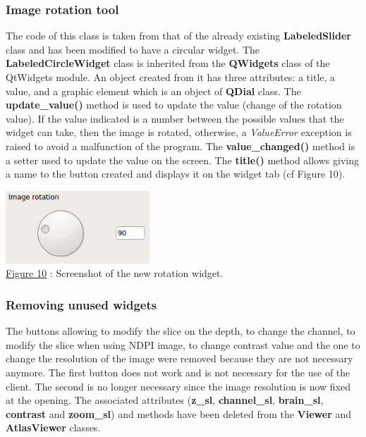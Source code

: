 \documentclass[a4paper,12pt]{report}
\begin{document}
\subsubsection{Image rotation tool}
The code of this class is taken from that of the already existing \textbf{LabeledSlider} class and has been modified to have a circular widget. The \textbf{LabeledCircleWidget} class is inherited from the \textbf{QWidgets} class of the QtWidgets module. An object created from it has three attributes: a title, a value, and a graphic element which is an object of \textbf{QDial} class. The \textbf{update\_value()} method is used to update the value (change of the rotation value). If the value indicated is a number between the possible values that the widget can take, then the image is rotated, otherwise, a \textit{ValueError} exception is raised to avoid a malfunction of the program. The \textbf{value\_changed()} method is a setter used to update the value on the screen. The \textbf{title()} method allows giving a name to the button created and displays it on the widget tab (cf Figure 10).\\
\begin{center} \includegraphics[scale=0.6]{rotationButton.png}\\
\underline{Figure 10} : Screenshot of the new rotation widget. \vspace{1\baselineskip}\\ \end{center}

\subsubsection{Removing unused widgets}
The buttons allowing to modify the slice on the depth, to change the channel, to modify the slice when using NDPI image, to change contrast value and the one to change the resolution of the image were removed because they are not necessary anymore. The first button does not work and is not necessary for the use of the client. The second is no longer necessary since the image resolution is now fixed at the opening. The associated attributes (\textbf{z\_sl}, \textbf{channel\_sl}, \textbf{brain\_sl}, \textbf{contrast} and \textbf{zoom\_sl}) and methods have been deleted from the \textbf{Viewer} and \textbf{AtlasViewer} classes.\\
\end{document}
